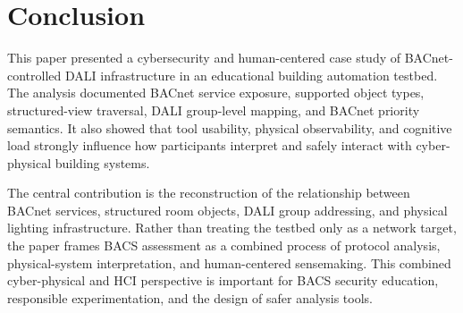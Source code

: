 \documentclass[10pt,conference]{IEEEtran}
\begin{document}
\section{Conclusion}

This paper presented a cybersecurity and human-centered case study of BACnet-controlled DALI infrastructure in an educational building automation testbed. The analysis documented BACnet service exposure, supported object types, structured-view traversal, DALI group-level mapping, and BACnet priority semantics. It also showed that tool usability, physical observability, and cognitive load strongly influence how participants interpret and safely interact with cyber-physical building systems.

The central contribution is the reconstruction of the relationship between BACnet services, structured room objects, DALI group addressing, and physical lighting infrastructure. Rather than treating the testbed only as a network target, the paper frames BACS assessment as a combined process of protocol analysis, physical-system interpretation, and human-centered sensemaking. This combined cyber-physical and HCI perspective is important for BACS security education, responsible experimentation, and the design of safer analysis tools.

\balance


\end{document}
